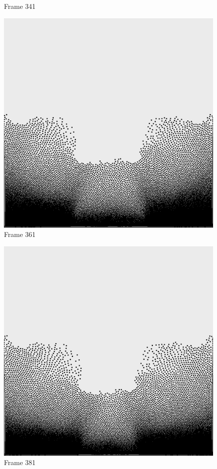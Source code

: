 \documentclass[a4paper, 12pt, oneside]{book}
\begin{document}
\begin{figure}[!ht]
\begin{center}
            Frame 341
        \end{center}
    \endminipage
    \hfill
        \begin{center}
            \includegraphics[width=\linewidth]{images/test_case_1/361.png}
            Frame 361
        \end{center}
    \endminipage
    \hfill
        \begin{center}
            \includegraphics[width=\linewidth]{images/test_case_1/381.png}
            Frame 381
        \end{center}
    \endminipage
    \hfill
\end{figure}
\end{document}
